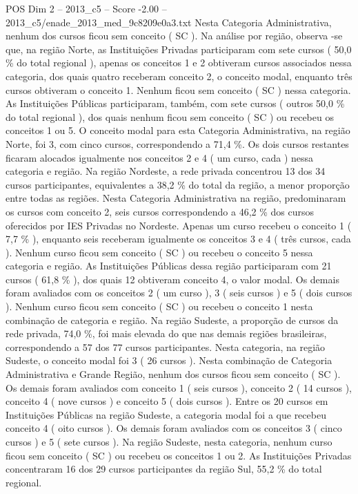 \begin{textsample}{POS Dim 2 – 2013\_c5 – Score -2.00 – 2013\_c5/enade\_2013\_med\_9c8209e0a3.txt}
Nesta Categoria Administrativa, nenhum dos cursos ficou sem conceito ( SC ).
Na análise por região, observa -se que, na região Norte, as Instituições Privadas participaram com sete cursos ( 50,0 \% do total regional ), apenas os conceitos 1 e 2 obtiveram cursos associados nessa categoria, dos quais quatro receberam conceito 2, o conceito modal, enquanto três cursos obtiveram o conceito 1.
Nenhum ficou sem conceito ( SC ) nessa categoria.
As Instituições Públicas participaram, também, com sete cursos ( outros 50,0 \% do total regional ), dos quais nenhum ficou sem conceito ( SC ) ou recebeu os conceitos 1 ou 5.
O conceito modal para esta Categoria Administrativa, na região Norte, foi 3, com cinco cursos, correspondendo a 71,4 \%.
Os dois cursos restantes ficaram alocados igualmente nos conceitos 2 e 4 ( um curso, cada ) nessa categoria e região.
Na região Nordeste, a rede privada concentrou 13 dos 34 cursos participantes, equivalentes a 38,2 \% do total da região, a menor proporção entre todas as regiões.
Nesta Categoria Administrativa na região, predominaram os cursos com conceito 2, seis cursos correspondendo a 46,2 \% dos cursos oferecidos por IES Privadas no Nordeste.
Apenas um curso recebeu o conceito 1 ( 7,7 \% ), enquanto seis receberam igualmente os conceitos 3 e 4 ( três cursos, cada ).
Nenhum curso ficou sem conceito ( SC ) ou recebeu o conceito 5 nessa categoria e região.
As Instituições Públicas dessa região participaram com 21 cursos ( 61,8 \% ), dos quais 12 obtiveram conceito 4, o valor modal.
Os demais foram avaliados com os conceitos 2 ( um curso ), 3 ( seis cursos ) e 5 ( dois cursos ).
Nenhum curso ficou sem conceito ( SC ) ou recebeu o conceito 1 nesta combinação de categoria e região.
Na região Sudeste, a proporção de cursos da rede privada, 74,0 \%, foi mais elevada do que nas demais regiões brasileiras, correspondendo a 57 dos 77 cursos participantes.
Nesta categoria, na região Sudeste, o conceito modal foi 3 ( 26 cursos ).
Nesta combinação de Categoria Administrativa e Grande Região, nenhum dos cursos ficou sem conceito ( SC ).
Os demais foram avaliados com conceito 1 ( seis cursos ), conceito 2 ( 14 cursos ), conceito 4 ( nove cursos ) e conceito 5 ( dois cursos ).
Entre os 20 cursos em Instituições Públicas na região Sudeste, a categoria modal foi a que recebeu conceito 4 ( oito cursos ).
Os demais foram avaliados com os conceitos 3 ( cinco cursos ) e 5 ( sete cursos ).
Na região Sudeste, nesta categoria, nenhum curso ficou sem conceito ( SC ) ou recebeu os conceitos 1 ou 2.
As Instituições Privadas concentraram 16 dos 29 cursos participantes da região Sul, 55,2 \% do total regional.

\end{textsample}
